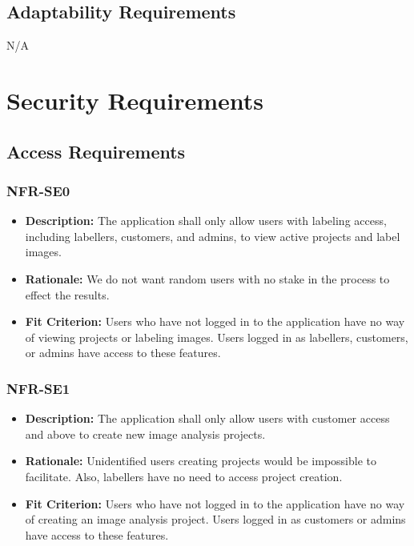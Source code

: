 \documentclass[12pt]{article}
\begin{document}
\subsection{Adaptability Requirements}
N/A

\section{Security Requirements}
\subsection{Access Requirements}
\subsubsection*{NFR-SE0}
\begin{itemize}
  \item \textbf{Description:} The application shall only allow users with labeling access, including labellers, customers, and admins, to view active projects and label images.
  \item \textbf{Rationale:} We do not want random users with no stake in the process to effect the results.
  \item \textbf{Fit Criterion:} Users who have not logged in to the application have no way of viewing projects or labeling images. Users logged in as labellers, customers, or admins have access to these features.
\end{itemize}
\subsubsection*{NFR-SE1}
\begin{itemize}
  \item \textbf{Description:} The application shall only allow users with customer access and above to create new image analysis projects.
  \item \textbf{Rationale:} Unidentified users creating projects would be impossible to facilitate. Also, labellers have no need to access project creation. 
  \item \textbf{Fit Criterion:} Users who have not logged in to the application have no way of creating an image analysis project. Users logged in as customers or admins have access to these features.
\end{itemize}
\end{document}
